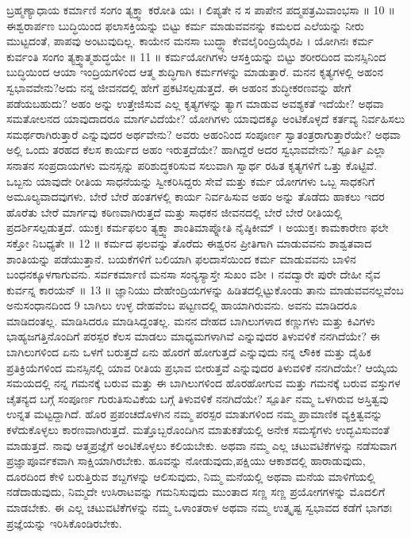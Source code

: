 ಬ್ರಹ್ಮಣ್ಯಾಧಾಯ ಕರ್ಮಾಣಿ ಸಂಗಂ ತ್ಯಕ್ತ್ವಾ ಕರೋತಿ ಯಃ ।
ಲಿಪ್ಯತೇ ನ ಸ ಪಾಪೇನ ಪದ್ಮಪತ್ರಮಿವಾಂಭಸಾ ॥ 10 ॥
 ಈಶ್ವರಾರ್ಪಣ ಬುದ್ಧಿಯಿಂದ ಫಲಾಸಕ್ತಿಯನ್ನು ಬಿಟ್ಟು ಕರ್ಮ ಮಾಡುವವನನ್ನು ಕಮಲದ ಎಲೆಯನ್ನು ನೀರು  ಮುಟ್ಟದಂತೆ, ಪಾಪವು ಅಂಟುವುದಿಲ್ಲ.
ಕಾಯೇನ ಮನಸಾ ಬುದ್ಧ್ಯಾ ಕೇವಲೈರಿಂದ್ರಿಯೈರಪಿ ।
ಯೋಗಿನಃ ಕರ್ಮ ಕುರ್ವಂತಿ ಸಂಗಂ ತ್ಯಕ್ತ್ವಾತ್ಮಶುದ್ಧಯೇ ॥ 11 ॥
 ಕರ್ಮಯೋಗಿಗಳು ಆಸಕ್ತಿಯನ್ನು ಬಿಟ್ಟು ಶರೀರದಿಂದ ಮನಸ್ಸಿನಿಂದ ಬುದ್ಧಿಯಿಂದ ಆಯಾ ಇಂದ್ರಿಯಗಳಿಂದ ಆತ್ಮ ಶುದ್ಧಿಗಾಗಿ ಕರ್ಮಗಳನ್ನು ಮಾಡುತ್ತಾರೆ.
ಮನನ 
 ಕೃತ್ಯಗಳಲ್ಲಿ ಅಹಂನ ಸ್ವಭಾವವೇನು?ಅದು ನನ್ನ ಜೀವನದಲ್ಲಿ ಹೇಗೆ ಪ್ರಕಟಿಸಲ್ಪಡುತ್ತದೆ. ಈ ಅಹಂನ ಶುದ್ಧೀಕರಣವನ್ನು ಹೇಗೆ ಪಡೆಯಬಹುದು? ಅಹಂ ಅನ್ನು ಉತ್ತೇಜಿಸುವ ಎಲ್ಲ ಕೃತ್ಯಗಳನ್ನು ತ್ಯಾಗ ಮಾಡುವ ಅವಶ್ಯಕತೆ ಇದೆಯೇ? ಅಥವಾ ಸಮತೋಲನದ ಯಾವುದಾದರೂ ಮಾರ್ಗವಿದೆಯೇ? ಯೋಗಿಗಳು ಯಾವುದಕ್ಕೂ ಅಂಟಿಕೊಳ್ಳದೆ ಕರ್ತವ್ಯ ನಿರ್ವಹಿಸಲು ಸಮರ್ಥರಾಗಿರುತ್ತಾರೆ ಎನ್ನುವುದರ ಅರ್ಥವೇನು? ಅವರು ಅಹಂನಿಂದ ಸಂಪೂರ್ಣ ಸ್ವಾತಂತ್ರರಾಗುತ್ತಾರೆಯೇ? ಅಥವಾ ಅಲ್ಲಿ ಒಂದು ತರಹದ ಕೆಲಸ ಕಾರ್ಯದ ಅಹಂ ಇರುತ್ತದೆಯೇ? ಹಾಗಿದ್ದರೆ ಅದರ ಸ್ವಭಾವವೇನು?
 ಸ್ಪೂರ್ತಿ 
 ಎಲ್ಲಾ ಸನಾತನ ಸಂಪ್ರದಾಯಗಳು ಮನಸ್ಸನ್ನು ಪರಿಶುದ್ಧಕರಿಸುವ ಸಲುವಾಗಿ ಸ್ವಾರ್ಥ ರಹಿತ ಕೃತ್ಯಗಳಿಗೆ ಒತ್ತು ಕೊಟ್ಟಿವೆ. ಒಬ್ಬನು ಯಾವುದೇ ರೀತಿಯ ಸಾಧನೆಯನ್ನು ಸ್ವೀಕರಿಸಿದ್ದರು ಸೇವೆ ಮತ್ತು ಕರ್ಮ ಯೋಗಗಳು ಒಬ್ಬ ಸಾಧಕನಿಗೆ ಅಮೂಲ್ಯವಾದವುಗಳು. ಬೇರೆ ಬೇರೆ ಹಂತಗಳಲ್ಲಿ  ಕಾರ್ಯ  ನಿರ್ವಹಿಸುವ ಅಹಂ ಅನ್ನು ತೊಡೆದು ಹಾಕಲು ಇದರ ಹೊರೆತು ಬೇರೆ ಮಾರ್ಗವು ಕಠಿಣವಾಗಿರುತ್ತದೆ ಮತ್ತು ಸಾಧಕನ ಜೀವನದಲ್ಲಿ ಬೇರೆ ಬೇರೆ ರೀತಿಯಲ್ಲಿ ಪ್ರದರ್ಶಿಸಲ್ಪಡುತ್ತದೆ.
ಯುಕ್ತಃ ಕರ್ಮಫಲಂ ತ್ಯಕ್ತ್ವಾ ಶಾಂತಿಮಾಪ್ನೋತಿ ನೈಷ್ಠಿಕೀಮ್ ।
ಅಯುಕ್ತಃ ಕಾಮಕಾರೇಣ ಫಲೇ ಸಕ್ತೋ ನಿಬಧ್ಯತೇ ॥ 12 ॥
 ಕರ್ಮದ ಫಲವನ್ನು ತೊರೆದು ಈಶ್ವರನ ಪ್ರೀತಿಗಾಗಿ ಮಾಡುವವನು ಶಾಶ್ವತವಾದ ಶಾಂತಿಯನ್ನು ಪಡೆಯುತ್ತಾನೆ. ಬಯಕೆಗಳಿಗೆ ಬಲಿಯಾಗಿ ಫಲದಾಸೆಯಿಂದ ಕರ್ಮ ಮಾಡುವವನು ಬಾಳಿನ ಬಂಧನಕ್ಕೂಳಗಾಗುವನು.
ಸರ್ವಕರ್ಮಾಣಿ ಮನಸಾ ಸಂನ್ಯಸ್ಯಾಸ್ತೇ ಸುಖಂ ವಶೀ ।
ನವದ್ವಾರೇ ಪುರೇ ದೇಹೀ ನೈವ ಕುರ್ವನ್ನ ಕಾರಯನ್ ॥ 13 ॥
 ಜ್ಞಾನಿಯು ದೇಹೇಂದ್ರಿಯಗಳನ್ನು ಹಿಡಿತದಲ್ಲಿಟ್ಟುಕೊಂಡು ತಾನು ಮಾಡುವವನಲ್ಲವೆಂಬ ಅನುಸಂಧಾನದಿಂದ 9 ಬಾಗಿಲು ಉಳ್ಳ ದೇಹವೆಂಬ ಪಟ್ಟಣದಲ್ಲಿ ಹಾಯಾಗಿರುವನು. ಅವನು ಮಾಡಿದರೂ ಮಾಡಿದಂತಲ್ಲ. ಮಾಡಿಸಿದರೂ ಮಾಡಿಸಿದ್ದಂತಲ್ಲ. 
ಮನನ
 ದೇಹದ ಬಾಗಿಲುಗಳಾದ ಕಣ್ಣುಗಳು ಮತ್ತು ಕಿವಿಗಳು  ಭಾಹ್ಯಜಗತ್ತಿನೊಂದಿಗೆ ಪರಸ್ಪರ ಕೆಲಸ ಮಾಡಲು ಮಾಧ್ಯಮಗಳಾಗಿವೆ ಎನ್ನುವುದರ ತಿಳುವಳಿಕೆ  ನನಗಿದೆಯೇ? ಈ ಬಾಗಿಲುಗಳಿಂದ ಏನು ಒಳಗೆ ಬರುತ್ತದೆ ಏನು ಹೊರಗೆ ಹೋಗುತ್ತದೆ ಎನ್ನುವುದು ನನ್ನ ಲೌಕಿಕ ಮತ್ತು ದೈಹಿಕ ಪ್ರತಿಕ್ರಿಯೆಗಳಿಂದ ಮನಸ್ಸಿನಲ್ಲಿ ಯಾವ ರೀತಿಯ ಪ್ರಭಾವ ಬೀರುತ್ತವೆ ಎನ್ನುವುದರ ತಿಳುವಳಿಕೆ ನನಗಿದೆಯೇ?  ಆಯ್ಕೆಯ  ಸಮಯದಲ್ಲಿ ನನ್ನ ಗಮನಕ್ಕೆ ಬರುವ ಮತ್ತು ಈ ಬಾಗಿಲುಗಳಿಂದ ಹೊರಹೋಗುವ ಮತ್ತು ಗಮನಕ್ಕೆ ಬರುವ ವಸ್ತುಗಳ ಚೈತನ್ಯದ ಬಗ್ಗೆ ಸಂಪೂರ್ಣ ಗುರುತಿಸುವಿಕೆಯ ಬಗ್ಗೆ ತಿಳುವಳಿಕೆ ನನಗಿದೆಯೇ?
 ಸ್ಪೂರ್ತಿ 
 ನಮ್ಮ ಒಳಗಿರುವ ಅಸ್ತಿತ್ವವು ಉನ್ನತ ಮಟ್ಟದ್ದಾಗಿದೆ. ಹೊರ ಪ್ರಪಂಚದೊಳಗಿನ ನಮ್ಮ ಪರಸ್ಪರ ಮಾತುಗಳಿಂದ ನಮ್ಮ ಪ್ರಾಮಾಣಿಕ ವ್ಯಕ್ತಿತ್ವವನ್ನು ಕಳೆದುಕೊಳ್ಳಲು ಕಾರಣವಾಗಿರುತ್ತದೆ. ಮತ್ತೊಬ್ಬರೊಂದಿಗಿನ ಮಾತುಕತೆಯಲ್ಲಿ ಅನೇಕ ಸಮಸ್ಯೆಗಳು ಉದ್ಭವಿಸುವಂತೆ ಮಾಡುತ್ತದೆ. ನಾವು ಆತ್ಮಪ್ರಜ್ಞೆಗೆ ಅಂಟಿಕೊಳ್ಳಲು ಕಲಿಯಬೇಕು. ಅಥವಾ ನಮ್ಮ ಎಲ್ಲ ಚಟುವಟಿಕೆಗಳನ್ನು ನಡೆಸುವಾಗ ಪ್ರಜ್ಞಾಪೂರ್ವಕವಾಗಿ   ಸಾಕ್ಷಿಯಾಗಿರಬೇಕು. ಹೂವನ್ನು ನೋಡುವುದು,ಪಕ್ಷಿಯು ಆಕಾಶದಲ್ಲಿ ಹಾರಾಡುವುದು, ದೂರದಿಂದ ಕೇಳಿ ಬರುತ್ತಿರುವ ಶಬ್ದಗಳನ್ನು ಆಲಿಸುವುದು, ನಿಮ್ಮ ಮನೆಯಲ್ಲಿ ಅಥವಾ ಮನೆಯ ಮಾಳಿಗೆಯಲ್ಲಿ ನಡೆದಾಡುವುದು, ನಿಮ್ಮದೇ ಉಸಿರಾಟವನ್ನು ಗಮನಿಸುವುದು ಮುಂತಾದ ಸಣ್ಣ ಸಣ್ಣ ಪ್ರಯೋಗಗಳನ್ನು ಮೊದಲಿಗೆ ಮಾಡಬೇಕು. ಈ ಎಲ್ಲ ಚಟುವಟಿಕೆಗಳನ್ನು ನಮ್ಮ ಒಳಾಂತರಾಳ ಅಥವಾ ನಮ್ಮ ಉತ್ಕೃಷ್ಟ ಸ್ವಭಾವದ ಕಡೆಗೆ ಭಾಗಶಃ ಪ್ರಜ್ಞೆಯನ್ನು ಇರಿಸಿಕೊಂಡಿರಬೇಕು.
